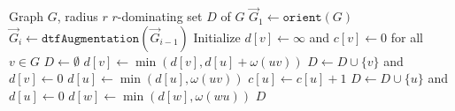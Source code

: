 \begin{algorithm}[!b]
	\begin{algorithmic}[1]
		\Require Graph $G$, radius $r$
		\Ensure $r$-dominating set $D$ of $G$
		\State $\vec G_1\leftarrow \texttt{orient}(G)$\label{algstep:dtf_start}
			\State $\vec G_i\leftarrow \texttt{dtfAugmentation}(\vec G_{i-1})$\label{algstep:dtf_end}
		\EndFor
		\State Initialize $d[v] \leftarrow \infty$ and $c[v] \leftarrow 0$ for all~$v \in G$
		\State $D\leftarrow \emptyset$
		\label{algstep:order}
			 \label{algstep:pull-loop}
				\State $d[v]\leftarrow\operatorname{min}\left(d[v], d[u]+\omega(uv)\right)$\label{algstep:pull}
			\EndFor
				\State $D\leftarrow D\cup \{v\}$ and
					   $d[v]\leftarrow 0$\label{algstep:add_to_domset}\label{algstep:D1}
				\label{algstep:pushloop}
					\State $d[u]\leftarrow \operatorname{min}\left(d[u],\omega(uv)\right)$\label{algstep:push}
					\State $c[u]\leftarrow c[u] + 1$
						\State $D\leftarrow D\cup \{u\}$ and
							   $d[u]\leftarrow 0$\label{algstep:D2}
							\State $d[w]\leftarrow \operatorname{min}\left(d[w],\omega(wu)\right)$\label{algstep:D2end}
						\EndFor
					\EndIf
				\EndFor
			\EndIf
		\EndFor
		\State \Return $D$
	\end{algorithmic}
	\caption{$\texttt{rdomset}(G, r)$}\label{alg:r-domset}
\end{algorithm}
